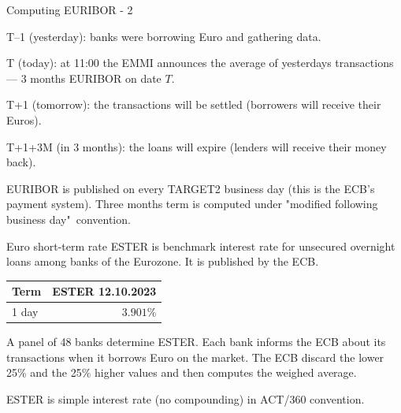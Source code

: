 \documentclass{beamer}
\begin{document}
\begin{frame}{Computing EURIBOR - 2}
\centering
{}
	
\justify
T--1 (yesterday):  banks were borrowing Euro and gathering data.

T (today): at 11:00 the EMMI announces the average of yesterdays transactions --- 3 months EURIBOR on date $T$.

T+1 (tomorrow): the transactions will be settled (borrowers will receive their Euros).

T+1+3M (in 3 months): the loans will expire (lenders will receive their money back).

\justify
EURIBOR is published on every TARGET2 business day (this is the ECB's payment system). Three months term is computed under "modified following business day"\ convention.
\end{frame}



\begin{frame}{Euro short-term rate}
\justify
\alert{ESTER} is benchmark interest rate for unsecured overnight loans among banks of the Eurozone. It is published by the ECB.

\justify
\centering
\begin{tabular}{l|r}
Term  & ESTER 12.10.2023 \\ \hline
1 day & $3.901\%$
\end{tabular}

\justify
A panel of 48 banks determine ESTER. Each bank informs the ECB about its transactions when it borrows Euro on the market. The ECB discard the lower 25\%  and the 25\% higher values and then computes the weighed average.

\justify
ESTER is simple interest rate (no compounding) in ACT/360 convention.
\end{frame}
\end{document}

